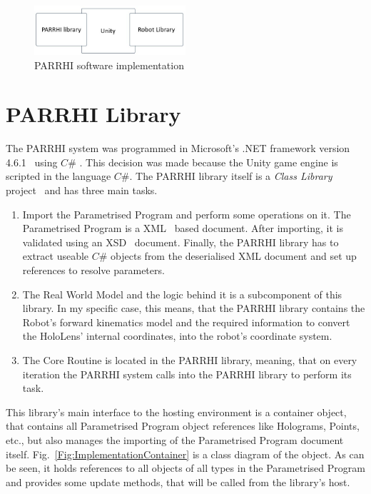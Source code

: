\begin{figure}[!h]
	\centering
	\includegraphics[width=0.5\textwidth]{Figures/Implementation_SystemSetup.jpg}
	\caption{PARRHI software implementation}
	\label{Fig:Implementation}
\end{figure}

\section{PARRHI Library}
The PARRHI system was programmed in Microsoft's .NET framework version 4.6.1~\cite{NETFramework} using $C\#$ \cite{CSharp}. This decision was made because the Unity game engine is scripted in the language $C\#$. The PARRHI library itself is a \textit{Class Library} project~\cite{ClassLibrary} and has three main tasks.

\begin{enumerate}
	\item Import the Parametrised Program and perform some operations on it. The Parametrised Program is a XML~\cite{xmlW3C} based document. After importing, it is validated using an XSD~\cite{xsdW3C} document. Finally, the PARRHI library has to extract useable $C\#$ objects from the deserialised XML document and set up references to resolve parameters.
	\item The Real World Model and the logic behind it is a subcomponent of this library. In my specific case, this means, that the PARRHI library contains the Robot's forward kinematics model and the required information to convert the HoloLens' internal coordinates, into the robot's coordinate system.
	\item The Core Routine is located in the PARRHI library, meaning, that on every iteration the PARRHI system calls into the PARRHI library to perform its task.
\end{enumerate}

This library's main interface to the hosting environment is a container object, that contains all Parametrised Program object references like Holograms, Points, etc., but also manages the importing of the Parametrised Program document itself. Fig.~\ref{Fig:ImplementationContainer} is a class diagram of the  object. As can be seen, it holds references to all objects of all types in the Parametrised Program and provides some update methods, that will be called from the library's host.

